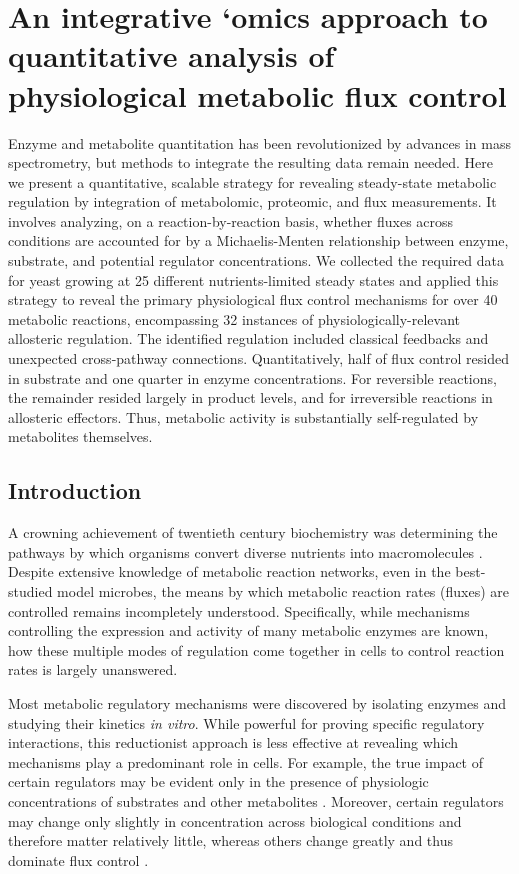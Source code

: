 
\chapter{An integrative `omics approach to quantitative analysis of physiological metabolic flux control\label{ch:simmer}}

Enzyme and metabolite quantitation has been revolutionized by advances in mass spectrometry, but methods to integrate the resulting data remain needed. Here we present a quantitative, scalable strategy for revealing steady-state metabolic regulation by integration of metabolomic, proteomic, and flux measurements. It involves analyzing, on a reaction-by-reaction basis, whether fluxes across conditions are accounted for by a Michaelis-Menten relationship between enzyme, substrate, and potential regulator concentrations. We collected the required data for yeast growing at 25 different nutrients-limited steady states and applied this strategy to reveal the primary physiological flux control mechanisms for over 40 metabolic reactions, encompassing 32 instances of physiologically-relevant allosteric regulation. The identified regulation included classical feedbacks and unexpected cross-pathway connections. Quantitatively, half of flux control resided in substrate and one quarter in enzyme concentrations. For reversible reactions, the remainder resided largely in product levels, and for irreversible reactions in allosteric effectors. Thus, metabolic activity is substantially self-regulated by metabolites themselves.


\section{Introduction}

A crowning achievement of twentieth century biochemistry was determining the pathways by which organisms convert diverse nutrients into macromolecules \cite{Caspi:2014je}. Despite extensive knowledge of metabolic reaction networks, even in the best-studied model microbes, the means by which metabolic reaction rates (fluxes) are controlled remains incompletely understood. Specifically, while mechanisms controlling the expression and activity of many metabolic enzymes are known, how these multiple modes of regulation come together in cells to control reaction rates is largely unanswered.

Most metabolic regulatory mechanisms were discovered by isolating enzymes and studying their kinetics \textit{in vitro}. While powerful for proving specific regulatory interactions, this reductionist approach is less effective at revealing which mechanisms play a predominant role in cells. For example, the true impact of certain regulators may be evident only in the presence of physiologic concentrations of substrates and other metabolites \cite{Fell:1997wg, Tummler:2014cp}. Moreover, certain regulators may change only slightly in concentration across biological conditions and therefore matter relatively little, whereas others change greatly and thus dominate flux control \cite{Kacser:1973fe}. 

